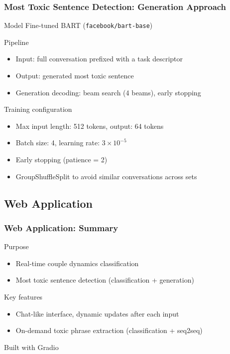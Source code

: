 \documentclass{beamer}
\begin{document}
\begin{frame}
\frametitle{Most Toxic Sentence Detection: Generation Approach}

\begin{block}{Model}
Fine-tuned BART (\texttt{facebook/bart-base})
\end{block}

\begin{block}{Pipeline}
\begin{itemize}
\item Input: full conversation prefixed with a task descriptor
\item Output: generated most toxic sentence
\item Generation decoding: beam search (4 beams), early stopping
\end{itemize}
\end{block}

\begin{exampleblock}{Training configuration}
\begin{itemize}
\item Max input length: 512 tokens, output: 64 tokens
\item Batch size: 4, learning rate: $3 \times 10^{-5}$
\item Early stopping (patience = 2)
\item GroupShuffleSplit to avoid similar conversations across sets
\end{itemize}
\end{exampleblock}

\end{frame}

\subsection{Web Application}

\begin{frame}
\frametitle{Web Application: Summary}

\begin{block}{Purpose}
\begin{itemize}
\item Real-time couple dynamics classification
\item Most toxic sentence detection (classification + generation)
\end{itemize}
\end{block}

\begin{block}{Key features}
\begin{itemize}
\item Chat-like interface, dynamic updates after each input
\item On-demand toxic phrase extraction (classification + seq2seq)
\end{itemize}
\end{block}

\vspace{0.2cm}
\begin{center}
\colorbox{blue!10}{\parbox{0.8\linewidth}{\centering Built with Gradio}}
\end{center}

\end{frame}
\end{document}
